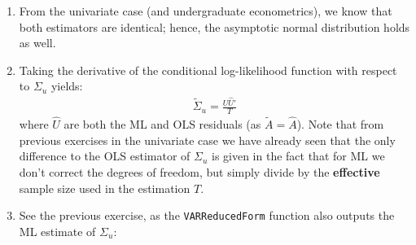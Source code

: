 \begin{enumerate}
\item
From the univariate case (and undergraduate econometrics),
  we know that both estimators are identical;
  hence, the asymptotic normal distribution holds as well.

\item
Taking the derivative of the conditional log-likelihood function with respect to \(\Sigma_u\) yields:
\begin{align*}
\widetilde{\Sigma}_u = \frac{\hat{U}\hat{U}'}{T}
\end{align*}
where \(\hat{U}\) are both the ML and OLS residuals (as \(\widetilde{A}=\widehat{A}\)).
Note that from previous exercises in the univariate case
  we have already seen that the only difference to the OLS estimator of \(\Sigma_u\)
  is given in the fact that for ML we don't correct the degrees of freedom,
  but simply divide by the \textbf{effective} sample size used in the estimation \(T\).

\item
See the previous exercise, as the \texttt{VARReducedForm} function also outputs the ML estimate of \(\Sigma_u\):


\end{enumerate}